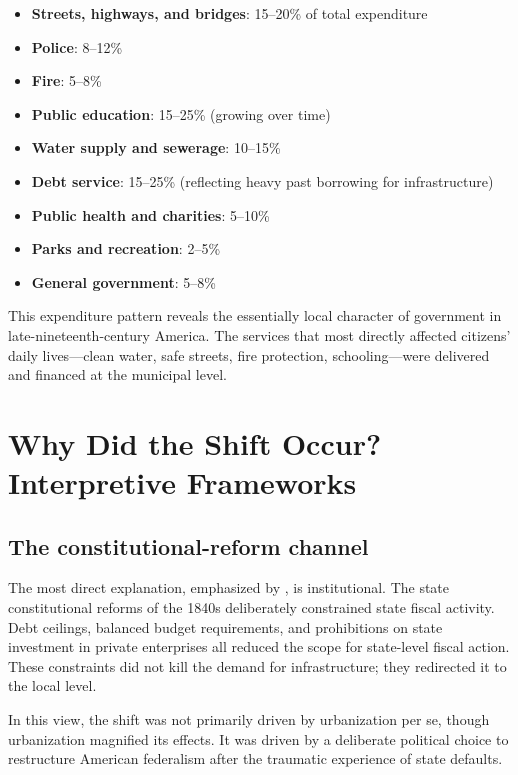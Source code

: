 \documentclass[12pt]{article}
\begin{document}
\begin{itemize}
    \item \textbf{Streets, highways, and bridges}: 15--20\% of total expenditure
    \item \textbf{Police}: 8--12\%
    \item \textbf{Fire}: 5--8\%
    \item \textbf{Public education}: 15--25\% (growing over time)
    \item \textbf{Water supply and sewerage}: 10--15\%
    \item \textbf{Debt service}: 15--25\% (reflecting heavy past borrowing for infrastructure)
    \item \textbf{Public health and charities}: 5--10\%
    \item \textbf{Parks and recreation}: 2--5\%
    \item \textbf{General government}: 5--8\%
\end{itemize}

This expenditure pattern reveals the essentially local character of government in late-nineteenth-century America.  The services that most directly affected citizens' daily lives---clean water, safe streets, fire protection, schooling---were delivered and financed at the municipal level.


\section{Why Did the Shift Occur? Interpretive Frameworks}

\subsection{The constitutional-reform channel}

The most direct explanation, emphasized by \citet{wallis2005constitutions}, is institutional.  The state constitutional reforms of the 1840s deliberately constrained state fiscal activity.  Debt ceilings, balanced budget requirements, and prohibitions on state investment in private enterprises all reduced the scope for state-level fiscal action.  These constraints did not kill the demand for infrastructure; they redirected it to the local level.

In this view, the shift was not primarily driven by urbanization per se, though urbanization magnified its effects.  It was driven by a deliberate political choice to restructure American federalism after the traumatic experience of state defaults.
\end{document}
